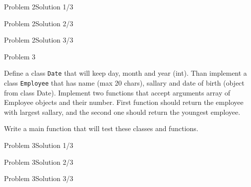 \begin{frame}[fragile]{Problem 2}{Solution 1/3}

\end{frame}

\begin{frame}[fragile]{Problem 2}{Solution 2/3}

\end{frame}

\begin{frame}[fragile]{Problem 2}{Solution 3/3}

\end{frame}

\begin{frame}{Problem 3}
\begin{scriptsize}
Define a class \texttt{Date} that will keep day, month and year (int). Than
implement a class \texttt{Employee} that has name (max 20 chars), sallary and
date of birth (object from class Date). Implement two functions that accept
arguments array of Employee objects and their number. First function should
return the employee with largest sallary, and the second one should return the
youngest employee.

Write a main function that will test these classes and functions.
\end{scriptsize}
\end{frame}

\begin{frame}[fragile]{Problem 3}{Solution 1/3}

\end{frame}
\begin{frame}[fragile]{Problem 3}{Solution 2/3}

\end{frame}
\begin{frame}[fragile]{Problem 3}{Solution 3/3}

\end{frame}
